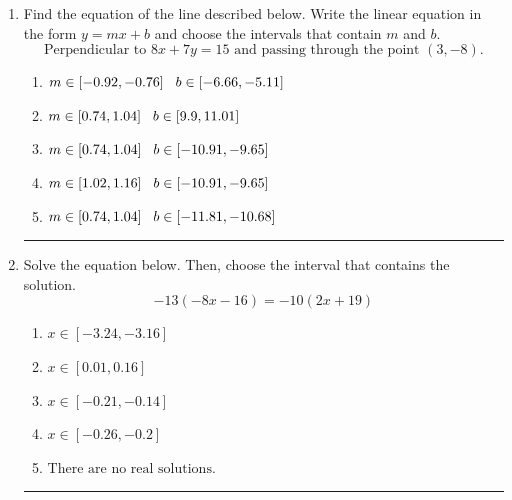\documentclass[14pt]{extbook}
\newcommand{\litem}[1]{\item#1\hspace*{-1cm}\rule{\textwidth}{0.4pt}}
\begin{document}
\begin{enumerate}
\litem{
Find the equation of the line described below. Write the linear equation in the form $ y=mx+b $ and choose the intervals that contain $m$ and $b$.\[ \text{Perpendicular to } 8 x + 7 y = 15 \text{ and passing through the point } (3, -8). \]\begin{enumerate}[label=\Alph*.]
\item \( m \in [-0.92, -0.76] \hspace*{3mm} b \in [-6.66, -5.11] \)
\item \( m \in [0.74, 1.04] \hspace*{3mm} b \in [9.9, 11.01] \)
\item \( m \in [0.74, 1.04] \hspace*{3mm} b \in [-10.91, -9.65] \)
\item \( m \in [1.02, 1.16] \hspace*{3mm} b \in [-10.91, -9.65] \)
\item \( m \in [0.74, 1.04] \hspace*{3mm} b \in [-11.81, -10.68] \)

\end{enumerate} }
\litem{
Solve the equation below. Then, choose the interval that contains the solution.\[ -13(-8x -16) = -10(2x + 19) \]\begin{enumerate}[label=\Alph*.]
\item \( x \in [-3.24, -3.16] \)
\item \( x \in [0.01, 0.16] \)
\item \( x \in [-0.21, -0.14] \)
\item \( x \in [-0.26, -0.2] \)
\item \( \text{There are no real solutions.} \)


\end{enumerate}}
\end{enumerate}
\end{document}
